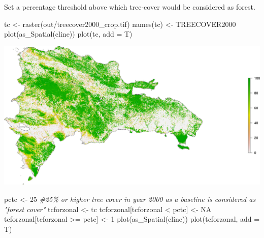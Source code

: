 \documentclass[10pt,landscape,a3paper]{article}
\newenvironment{Shaded}{\begin{snugshade}}{\end{snugshade}}
\newcommand{\AttributeTok}[1]{\textcolor[rgb]{0.77,0.63,0.00}{#1}}
\newcommand{\CommentTok}[1]{\textcolor[rgb]{0.56,0.35,0.01}{\textit{#1}}}
\newcommand{\ConstantTok}[1]{\textcolor[rgb]{0.00,0.00,0.00}{#1}}
\newcommand{\DecValTok}[1]{\textcolor[rgb]{0.00,0.00,0.81}{#1}}
\newcommand{\FunctionTok}[1]{\textcolor[rgb]{0.00,0.00,0.00}{#1}}
\newcommand{\NormalTok}[1]{#1}
\newcommand{\OtherTok}[1]{\textcolor[rgb]{0.56,0.35,0.01}{#1}}
\newcommand{\SpecialCharTok}[1]{\textcolor[rgb]{0.00,0.00,0.00}{#1}}
\newcommand{\StringTok}[1]{\textcolor[rgb]{0.31,0.60,0.02}{#1}}
\begin{document}
Set a percentage threshold above which tree-cover would be considered as
forest.

\begin{Shaded}
\begin{Highlighting}[]
\NormalTok{tc }\OtherTok{\textless{}{-}} \FunctionTok{raster}\NormalTok{(}\StringTok{\textquotesingle{}out/treecover2000\_crop.tif\textquotesingle{}}\NormalTok{)}
\FunctionTok{names}\NormalTok{(tc) }\OtherTok{\textless{}{-}} \StringTok{\textquotesingle{}TREECOVER2000\textquotesingle{}}
\FunctionTok{plot}\NormalTok{(}\FunctionTok{as\_Spatial}\NormalTok{(cline))}
\FunctionTok{plot}\NormalTok{(tc, }\AttributeTok{add =}\NormalTok{ T)}
\end{Highlighting}
\end{Shaded}

\begin{center}\includegraphics{img/tree-canopy-cover-2000-nationwide-1} \end{center}

\begin{Shaded}
\begin{Highlighting}[]
\NormalTok{pctc }\OtherTok{\textless{}{-}} \DecValTok{25} \CommentTok{\#25\% or higher tree cover in year 2000 as a baseline is considered as "forest cover"}
\NormalTok{tcforzonal }\OtherTok{\textless{}{-}}\NormalTok{ tc}
\NormalTok{tcforzonal[tcforzonal }\SpecialCharTok{\textless{}}\NormalTok{ pctc] }\OtherTok{\textless{}{-}} \ConstantTok{NA}
\NormalTok{tcforzonal[tcforzonal }\SpecialCharTok{\textgreater{}=}\NormalTok{ pctc] }\OtherTok{\textless{}{-}} \DecValTok{1}
\FunctionTok{plot}\NormalTok{(}\FunctionTok{as\_Spatial}\NormalTok{(cline))}
\FunctionTok{plot}\NormalTok{(tcforzonal, }\AttributeTok{add =}\NormalTok{ T)}
\end{Highlighting}
\end{Shaded}
\end{document}
